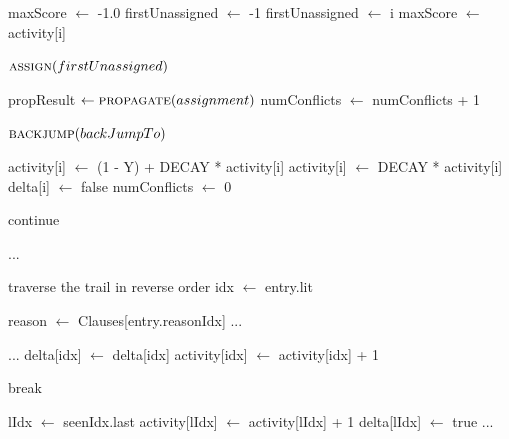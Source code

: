 \begin{algorithm}[H]
\caption{cVSIDS Solving Method}\label{alg:39}
\begin{algorithmic}[1]

\State {}

        \State maxScore $\gets$ -1.0
        \State firstUnassigned $\gets$ -1
                    \State firstUnassigned $\gets$ i
                    \State maxScore $\gets$ activity[i]
                \EndIf
            \EndIf
        \EndFor

        \State $\Call{assign}{firstUnassigned}$
    \EndIf

    \State propResult $\gets \Call{propagate}{assignment}$
        \State numConflicts $\gets$ numConflicts + 1

        \State {}

        \State $\Call{backjump}{backJumpTo}$
        \State {}

                \State activity[i] $\gets$ (1 - Y) + DECAY * activity[i]
            \Else
                \State activity[i] $\gets$ DECAY * activity[i]
            \EndIf
            \State delta[i] $\gets$ false
        \EndFor
        \State numConflicts $\gets$ 0

        \State continue
    \EndIf
\EndWhile

\EndProcedure
\end{algorithmic}
\end{algorithm}

\begin{algorithm}[H]
\caption{Normalized VSIDS First UIP resolution}\label{alg:40}
\begin{algorithmic}[1]

\State ...

 \Comment traverse the trail in reverse order
    \State idx $\gets$ entry.lit
    
        \State reason $\gets$ Clauses[entry.reasonIdx]
            \State ...
        \EndFor

        \State ...
        \State delta[idx] $\gets$ delta[idx]
        \State activity[idx] $\gets$ activity[idx] + 1
    \EndIf

        \State break
    \EndIf
\EndFor

    \State lIdx $\gets$ seenIdx.last 
    \State activity[lIdx] $\gets$ activity[lIdx] + 1
    \State delta[lIdx] $\gets$ true
    \State ...
\EndWhile

\EndProcedure
\end{algorithmic}
\end{algorithm}

